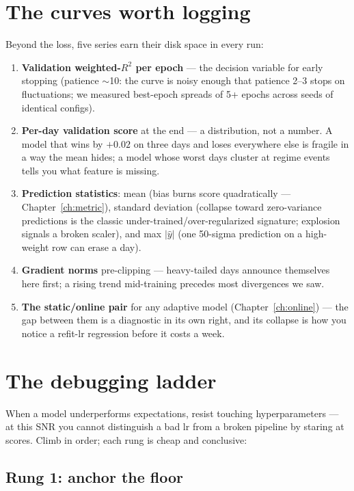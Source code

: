 \section{The curves worth logging}

Beyond the loss, five series earn their disk space in every run:

\begin{enumerate}
\item \textbf{Validation weighted-$R^2$ per epoch} --- the decision
  variable for early stopping (patience $\sim$10: the curve is noisy
  enough that patience 2--3 stops on fluctuations; we measured
  best-epoch spreads of 5+ epochs across seeds of identical configs).
\item \textbf{Per-day validation score} at the end --- a distribution, not
  a number. A model that wins by $+0.02$ on three days and loses
  everywhere else is fragile in a way the mean hides; a model whose
  worst days cluster at regime events tells you what feature is missing.
\item \textbf{Prediction statistics}: mean (bias burns score
  quadratically --- Chapter~\ref{ch:metric}), standard deviation
  (collapse toward zero-variance predictions is the classic
  under-trained/over-regularized signature; explosion signals a broken
  scaler), and max $|\hat y|$ (one 50-sigma prediction on a high-weight
  row can erase a day).
\item \textbf{Gradient norms} pre-clipping --- heavy-tailed days announce
  themselves here first; a rising trend mid-training precedes most
  divergences we saw.
\item \textbf{The static/online pair} for any adaptive model
  (Chapter~\ref{ch:online}) --- the gap between them is a diagnostic
  in its own right, and its collapse is how you notice a refit-lr
  regression before it costs a week.
\end{enumerate}

\section{The debugging ladder}

When a model underperforms expectations, resist touching hyperparameters
--- at this SNR you cannot distinguish a bad lr from a broken pipeline by
staring at scores. Climb in order; each rung is cheap and conclusive:

\subsection{Rung 1: anchor the floor}

